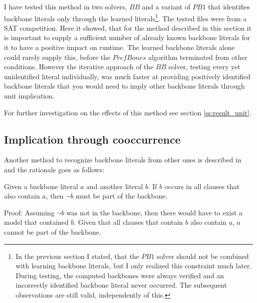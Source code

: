 I have tested this method in two solvers, $BB$ and a variant of $PB1$ that identifies backbone literals only through the learned literals\footnote{
	In the previous section I stated, that the $PB1$ solver should not be combined with learning backbone literals, but I only realized this constraint much later. During testing, the computed backbones were always verified and an incorrectly identified backbone literal never occurred. The subsequent observations are still valid, independently of this.}.
The tested files were from a SAT competition. Here it showed, that for the method described in this section it is important to supply a sufficient number of already known backbone literals for it to have a positive impact on runtime. The learned backbone literals alone could rarely supply this, before the $PrefBones$ algorithm terminated from other conditions. However the iterative approach of the $BB$ solver, testing every yet unidentified literal individually, was much faster at providing positively identified backbone literals that you would need to imply other backbone literals through unit implication.


For further investigation on the effects of this method see section \ref{ss:result_unit}.






\subsection{Implication through cooccurrence}
\label{subsec:coocc}

Another method to recognize backbone literals from other ones is described in \cite{wbxcl16} and the rationale goes as follows:

\begin{lemma}
Given a backbone literal $a$ and another literal $b$. If $b$ occurs in all clauses that also contain $a$, then $\neg b$ must be part of the backbone. 

Proof: Assuming $\neg b$ was not in the backbone, then there would have to exist a model that contained $b$. Given that all clauses that contain $b$ also contain $a$, $a$ cannot be part of the backbone.
\end{lemma}

